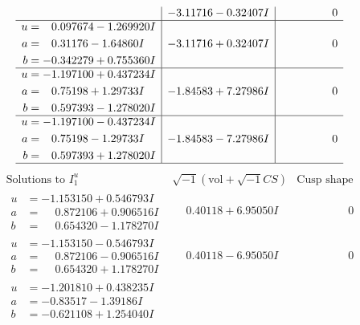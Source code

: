 \documentclass[1p]{elsarticle_modified}
\theoremstyle{definition}
\newcommand{\I}{\sqrt{-1}}
\begin{document}
$$\begin{array}{c|c|c}
 & -3.11716 - 0.32407 I & \phantom{-0.000000 } 0 \\ \hline\begin{aligned}
u &= \phantom{-}0.097674 - 1.269920 I \\
a &= \phantom{-}0.31176 - 1.64860 I \\
b &= -0.342279 + 0.755360 I\end{aligned}
 & -3.11716 + 0.32407 I & \phantom{-0.000000 } 0 \\ \hline\begin{aligned}
u &= -1.197100 + 0.437234 I \\
a &= \phantom{-}0.75198 + 1.29733 I \\
b &= \phantom{-}0.597393 - 1.278020 I\end{aligned}
 & -1.84583 + 7.27986 I & \phantom{-0.000000 } 0 \\ \hline\begin{aligned}
u &= -1.197100 - 0.437234 I \\
a &= \phantom{-}0.75198 - 1.29733 I \\
b &= \phantom{-}0.597393 + 1.278020 I\end{aligned}
 & -1.84583 - 7.27986 I & \phantom{-0.000000 } 0\\
 \hline 
 \end{array}$$\newpage$$\begin{array}{c|c|c}  
\text{Solutions to }I^u_{1}& \I (\text{vol} + \sqrt{-1}CS) & \text{Cusp shape}\\
 \hline 
\begin{aligned}
u &= -1.153150 + 0.546793 I \\
a &= \phantom{-}0.872106 + 0.906516 I \\
b &= \phantom{-}0.654320 - 1.178270 I\end{aligned}
 & \phantom{-}0.40118 + 6.95050 I & \phantom{-0.000000 } 0 \\ \hline\begin{aligned}
u &= -1.153150 - 0.546793 I \\
a &= \phantom{-}0.872106 - 0.906516 I \\
b &= \phantom{-}0.654320 + 1.178270 I\end{aligned}
 & \phantom{-}0.40118 - 6.95050 I & \phantom{-0.000000 } 0 \\ \hline\begin{aligned}
u &= -1.201810 + 0.438235 I \\
a &= -0.83517 - 1.39186 I \\
b &= -0.621108 + 1.254040 I\end{aligned}

\end{array}$$
\end{document}
